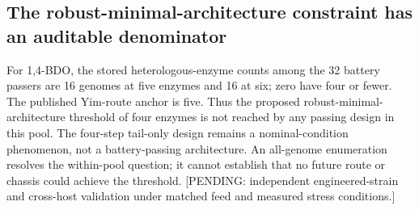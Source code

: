 \subsection{The robust-minimal-architecture constraint has an auditable denominator}
For 1,4-BDO, the stored heterologous-enzyme counts among the 32 battery passers are 16 genomes at five enzymes and 16 at six; zero have four or fewer. The published Yim-route anchor is five. Thus the proposed robust-minimal-architecture threshold of four enzymes is not reached by any passing design in this pool. The four-step tail-only design remains a nominal-condition phenomenon, not a battery-passing architecture. An all-genome enumeration resolves the within-pool question; it cannot establish that no future route or chassis could achieve the threshold. [PENDING: independent engineered-strain and cross-host validation under matched feed and measured stress conditions.]
